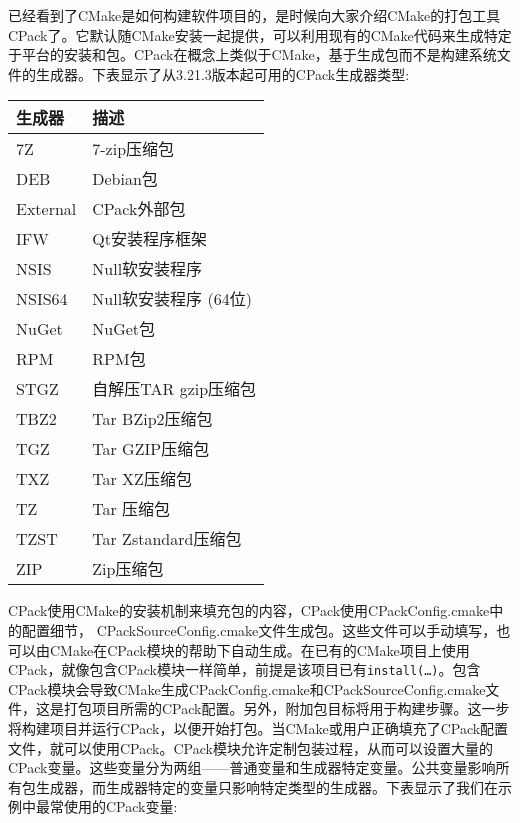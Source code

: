 已经看到了CMake是如何构建软件项目的，是时候向大家介绍CMake的打包工具CPack了。它默认随CMake安装一起提供，可以利用现有的CMake代码来生成特定于平台的安装和包。CPack在概念上类似于CMake，基于生成包而不是构建系统文件的生成器。下表显示了从3.21.3版本起可用的CPack生成器类型:

\begin{table}[H]
	\centering
	\begin{tabular}{|l|l|}
		\hline
		\textbf{生成器}    & \textbf{描述}             \\ \hline
		7Z                 & 7-zip压缩包                    \\ \hline
		DEB                & Debian包                   \\ \hline
		External           & CPack外部包           \\ \hline
		IFW                & Qt安装程序框架           \\ \hline
		NSIS               & Null软安装程序              \\ \hline
		NSIS64             & Null软安装程序 (64位)      \\ \hline
		NuGet              & NuGet包                   \\ \hline
		RPM                & RPM包                      \\ \hline
		STGZ               & 自解压TAR gzip压缩包 \\ \hline
		TBZ2               & Tar BZip2压缩包                \\ \hline
		TGZ                & Tar GZIP压缩包                 \\ \hline
		TXZ                & Tar XZ压缩包                   \\ \hline
		TZ                 & Tar 压缩包             \\ \hline
		TZST               & Tar Zstandard压缩包           \\ \hline
		ZIP                & Zip压缩包                      \\ \hline
	\end{tabular}
\end{table}

CPack使用CMake的安装机制来填充包的内容，CPack使用CPackConfig.cmake中的配置细节， CPackSourceConfig.cmake文件生成包。这些文件可以手动填写，也可以由CMake在CPack模块的帮助下自动生成。在已有的CMake项目上使用CPack，就像包含CPack模块一样简单，前提是该项目已有\texttt{install(…)}。包含CPack模块会导致CMake生成CPackConfig.cmake和CPackSourceConfig.cmake文件，这是打包项目所需的CPack配置。另外，附加包目标将用于构建步骤。这一步将构建项目并运行CPack，以便开始打包。当CMake或用户正确填充了CPack配置文件，就可以使用CPack。CPack模块允许定制包装过程，从而可以设置大量的CPack变量。这些变量分为两组——普通变量和生成器特定变量。公共变量影响所有包生成器，而生成器特定的变量只影响特定类型的生成器。下表显示了我们在示例中最常使用的CPack变量:


